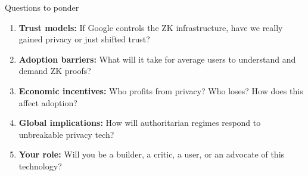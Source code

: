 \ifdefined\PRESENTATION\else\PassOptionsToClass{handout}{beamer}\fi\documentclass[aspectratio=169, lualatex]{beamer}
\begin{document}
\begin{frame}{Questions to ponder}
	\begin{enumerate}
		\item \textbf{Trust models:} If Google controls the ZK infrastructure, have we really gained privacy or just shifted trust?
		\item \textbf{Adoption barriers:} What will it take for average users to understand and demand ZK proofs?
		\item \textbf{Economic incentives:} Who profits from privacy? Who loses? How does this affect adoption?
		\item \textbf{Global implications:} How will authoritarian regimes respond to unbreakable privacy tech?
		\item \textbf{Your role:} Will you be a builder, a critic, a user, or an advocate of this technology?
	\end{enumerate}
\end{frame}

\begin{frame}[plain]
	\titlepage
\end{frame}
\end{document}
